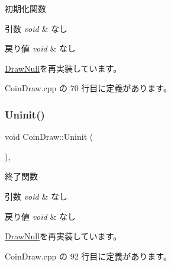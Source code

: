 初期化関数 


\begin{DoxyParams}{引数}
{\em void} & なし \\
\hline
\end{DoxyParams}

\begin{DoxyRetVals}{戻り値}
{\em void} & なし \\
\hline
\end{DoxyRetVals}


\mbox{\hyperlink{class_draw_null_a20aef1e54c1a158b741bfd731e18efdf}{Draw\+Null}}を再実装しています。



 Coin\+Draw.\+cpp の 70 行目に定義があります。

\mbox{\label{class_coin_draw_a6484c22a5598e298f18e7cd6083cd551}} 
\subsubsection{\texorpdfstring{Uninit()}{Uninit()}}
{\footnotesize\ttfamily void Coin\+Draw\+::\+Uninit (\begin{DoxyParamCaption}{ }\end{DoxyParamCaption})\hspace{0.3cm}{\ttfamily [override]}, {\ttfamily [virtual]}}



終了関数 


\begin{DoxyParams}{引数}
{\em void} & なし \\
\hline
\end{DoxyParams}

\begin{DoxyRetVals}{戻り値}
{\em void} & なし \\
\hline
\end{DoxyRetVals}


\mbox{\hyperlink{class_draw_null_a6e81d63efab7333e8d0e8af99362a4d9}{Draw\+Null}}を再実装しています。



 Coin\+Draw.\+cpp の 92 行目に定義があります。

\mbox{\label{class_coin_draw_a6157b17bf1706b85156aad0d88acfd7e}} 
